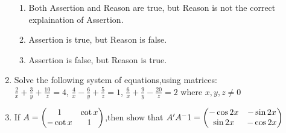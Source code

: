 \begin{enumerate}
\begin{enumerate}
			\item Both Assertion and Reason are true, but Reason is not the correct explaination of Assertion.
			\item Assertion is true, but Reason is false.
			\item Assertion is false, but Reason is true.
		\end{enumerate}
	\item Solve the following system of equations,using matrices:\\
		$\frac{2}{x} + \frac{3}{y} + \frac{10}{z}  = 4$, $\frac{4}{x} - \frac{6}{y}  + \frac{5}{z} =1$, $\frac{6}{x} + \frac{9}{y} - \frac{20}{z} = 2$ where $x,y,z \neq 0$\\
	\item If $A= \begin{pmatrix}1 & \cot x\\ -\cot x & 1\end{pmatrix}$,then show that $A'A^-1= \begin{pmatrix}-\cos 2x & -\sin 2x \\ \sin 2x & -\cos 2x\end{pmatrix}$
\end{enumerate}
